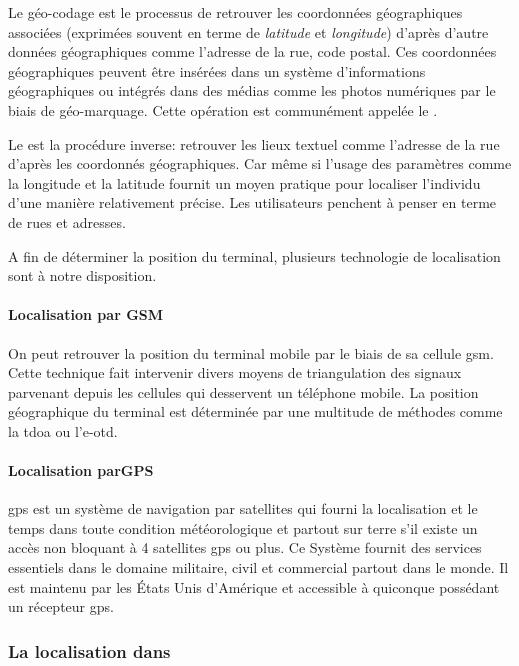 Le géo-codage est le processus de retrouver les coordonnées
géographiques associées (exprimées souvent en terme de \textit{latitude}
et \textit{longitude}) d'après d'autre données géographiques comme
l'adresse de la rue, code postal. Ces coordonnées géographiques peuvent
être insérées dans un système d'informations géographiques ou intégrés dans
des médias comme les photos numériques par le biais de géo-marquage.
Cette opération est communément appelée le .

Le  est la procédure inverse: retrouver les lieux textuel comme l'adresse de la rue d'après les coordonnés géographiques. Car même si l'usage des paramètres comme la longitude et la latitude fournit un moyen pratique pour localiser l'individu d'une manière relativement précise. Les utilisateurs penchent à penser en terme de rues et adresses.

A fin de déterminer la position du terminal, plusieurs technologie de localisation sont à notre disposition.

\paragraph[Localisation par GSM]{Localisation par GSM}

On peut retrouver la position du terminal mobile par le biais de sa
cellule \gls{gsm}. Cette technique fait intervenir divers moyens de
triangulation des signaux parvenant depuis les cellules qui desservent
un téléphone mobile. La position géographique du terminal est déterminée
par une multitude de méthodes comme la \gls{tdoa} ou l'\gls{e-otd}.

\paragraph[Localisation parGPS]{Localisation parGPS\cite{enig:gps}}

\gls{gps} est un système de navigation par satellites qui fourni la
localisation et le temps dans toute condition météorologique et partout
sur terre s'il existe un accès non bloquant à 4 satellites
\gls{gps} ou plus. Ce Système fournit des services essentiels dans le domaine
militaire, civil et commercial partout dans le monde. Il est maintenu
par les États Unis d'Amérique et accessible à quiconque possédant un
récepteur \gls{gps}.

\subsubsection[La localisation dans \android{}]{La localisation dans \android{}\cite{pa4ad:chptr13}}\label{sss:android_localisation}

